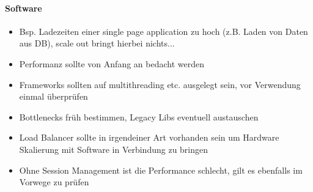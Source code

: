 \paragraph{Software}
\begin{itemize}
  \item Bsp. Ladezeiten einer single page application zu hoch (z.B. Laden von Daten aus DB), scale out bringt hierbei nichts...
  \item Performanz sollte von Anfang an bedacht werden
  \item Frameworks sollten auf multithreading etc. ausgelegt sein, vor Verwendung einmal überprüfen
  \item Bottlenecks früh bestimmen, Legacy Libs eventuell austauschen
  \item Load Balancer sollte in irgendeiner Art vorhanden sein um Hardware Skalierung mit Software in Verbindung zu bringen
  \item Ohne Session Management ist die Performance schlecht, gilt es ebenfalls im Vorwege zu prüfen
\end{itemize}
